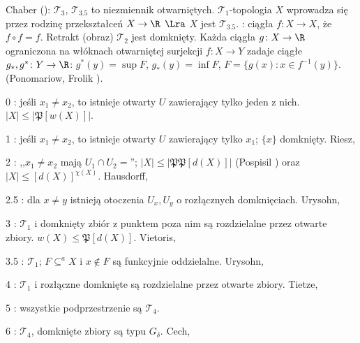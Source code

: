 Chaber (): $\mathcal T_3$, $\mathcal T_{3.5}$ to niezmiennik otwarniętych.
$\mathcal T_1$-topologia $X$ wprowadza się przez rodzinę przekształceń $X \to \R$ $\Lra$ $X$ jest $\mathcal T_{3.5}$.
: ciągła $f \colon X \to X$, że $f \circ f = f$. Retrakt (obraz) $\mathcal T_2$ jest domknięty.
Każda ciągła $g \colon X \to \R$ ograniczona na włóknach otwarniętej surjekcji $f \colon X \to Y$ zadaje ciągłe $g_*, g^* \colon Y \to \R$: $g^*(y) = \sup F$, $g_*(y) = \inf F$, $F = \{g(x) : x \in f^{-1}(y)\}$. (Ponomariow, Frolik ).
\begin{itemx}
\item [0] : jeśli $x_1 \neq x_2$, to istnieje otwarty $U$ zawierający tylko jeden z nich. $|X| \le |\mathfrak P [w(X)]|$.
\item [1] : jeśli $x_1 \neq x_2$, to istnieje otwarty $U$ zawierający tylko $x_1$; $\{x\}$ domknięty. \hfill Riesz, 
\item [2] : ,,$x_1 \neq x_2$ mają $U_1 \cap U_2 = $''; $|X| \le |\mathfrak P \mathfrak P [d(X)]|$ (Pospisil ) oraz $|X| \le [d(X)]^{\chi(X)}$. \hfill Hausdorff, 
\item [2.5] : dla $x \neq y$ istnieją otoczenia $U_x, U_y$ o rozłącznych domknięciach. \hfill Urysohn, 
\item [3] : $\mathcal T_1$ i domknięty zbiór z punktem poza nim są rozdzielalne przez otwarte zbiory. $w(X) \le \mathfrak P[d(X)]$. \hfill Vietoris, 
\item [3.5] : $\mathcal T_1$; $F \subseteq^a X$ i $x \not \in F$ są funkcyjnie oddzielalne. \hfill Urysohn, 
\item [4] : $\mathcal T_1$ i rozłączne domknięte są rozdzielalne przez otwarte zbiory. \hfill Tietze, 
\item [5] : wszystkie podprzestrzenie są $\mathcal T_4$.
\item [6] : $\mathcal T_4$, domknięte zbiory są typu $G_\delta$. \hfill Cech, 
\end{itemx}


